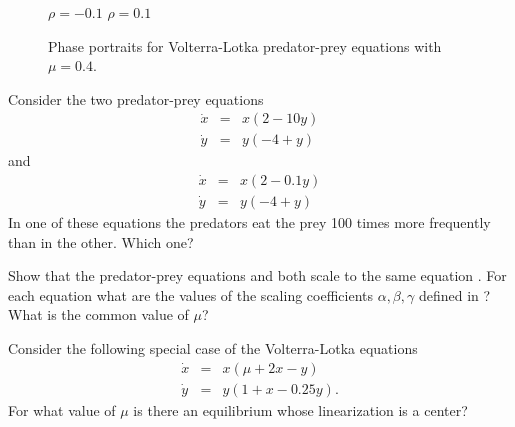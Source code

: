 \documentclass{ximera}
\begin{document}
\begin{figure}[htb]
           \centerline{%
	   }
		\vspace*{-0.2in}		
		\hspace{1.0in} $\rho=-0.1$ \hspace{2.5in} $\rho=0.1$
           \caption{Phase portraits for Volterra-Lotka predator-prey 
		equations \protect{} with $\mu=0.4$.}
           \label{F:pop3}
\end{figure}

\EXER

\TEXER

\begin{exercise} \label{c9.1.5}
Consider the two predator-prey equations
\begin{equation} \label{E:prpr1}
\begin{array}{rcl}
\dot{x} & = & x(2-10y)\\
\dot{y} & = & y(-4+y)
\end{array}
\end{equation}
and 
\begin{equation} \label{E:prpr2}
\begin{array}{rcl}
\dot{x} & = & x(2-0.1y)\\
\dot{y} & = & y(-4+y)
\end{array}
\end{equation}
In one of these equations the predators eat the prey 100 times more 
frequently than in the other.  Which one?
\end{exercise}

\begin{exercise} \label{c9.1.6}
Show that the predator-prey equations  and  both 
scale to the same equation .  For each equation what are the 
values of the scaling coefficients $\alpha,\beta,\gamma$ defined in 
?  What is the common value of $\mu$?
\end{exercise}



\begin{exercise} \label{c9.1.2}
Consider the following special case of the Volterra-Lotka equations 
\begin{eqnarray*}
\dot{x} & = & x(\mu + 2x -     y)  \\
\dot{y} & = & y(  1 +  x - 0.25y).
\end{eqnarray*}
For what value of $\mu$ is there an equilibrium whose linearization is a 
center?   
\end{exercise}
\end{document}
